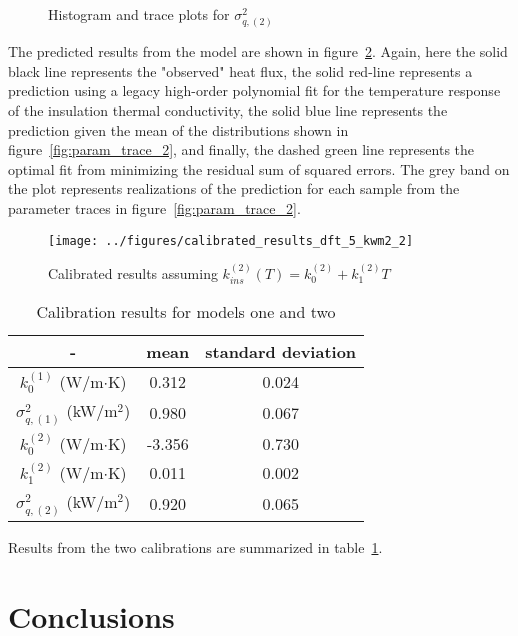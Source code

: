\documentclass[article]{proc}
\begin{document}
        \begin{figure}[!]
            \centering
            \qquad
            \caption{Histogram and trace plots for $\sigma_{q,(2)}^2$}
            \label{fig:sigma_trace_2}
        \end{figure}

        The predicted results from the model are shown in figure~\ref{fig:cal_results_2}. Again, here the solid black line represents the "observed" heat flux, the solid red-line represents a prediction using a legacy high-order polynomial fit for the temperature response of the insulation thermal conductivity, the solid blue line represents the prediction given the mean of the distributions shown in figure~\ref{fig:param_trace_2}, and finally, the dashed green line represents the optimal fit from minimizing the residual sum of squared errors. The grey band on the plot represents realizations of the prediction for each sample from the parameter traces in figure~\ref{fig:param_trace_2}. 

        \begin{figure}[!]
            \centering
            \texttt{[image: ../figures/calibrated\_results\_dft\_5\_kwm2\_2]}
            \caption{Calibrated results assuming $k^{(2)}_{ins}(T) = k^{(2)}_0 + k^{(2)}_1 T$}
            \label{fig:cal_results_2}
        \end{figure}

        \begin{table}[!]
        \centering
        \caption{Calibration results for models one and two}
        \begin{tabular}{ccc}
            \hline
            - & mean & standard deviation \\
            \hline
            $k_0^{(1)}$ (W/m$\cdot$K)       & 0.312     & 0.024 \\
            $\sigma_{q, (1)}^2$ (kW/m$^2$)  & 0.980     & 0.067 \\
            \hline
            $k_0^{(2)}$ (W/m$\cdot$K)       & -3.356    & 0.730 \\
            $k_{1}^{(2)}$ (W/m$\cdot$K)     & 0.011     & 0.002 \\
            $\sigma_{q, (2)}^2$ (kW/m$^2$)  & 0.920     & 0.065 \\
            \hline
        \end{tabular}
        \label{tbl:cal_results}
        \end{table}

        Results from the two calibrations are summarized in table~\ref{tbl:cal_results}. 



\section{Conclusions}

    
\clearpage

\scriptsize{

}
\end{document}
